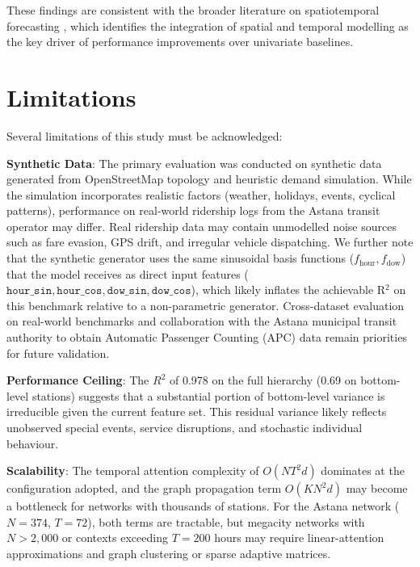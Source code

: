 These findings are consistent with the broader literature on spatiotemporal forecasting \cite{zhang2021deep,fan2020urban}, which identifies the integration of spatial and temporal modelling as the key driver of performance improvements over univariate baselines.

\section{Limitations}
\label{sec:discussion_limitations}

Several limitations of this study must be acknowledged:

\textbf{Synthetic Data}: The primary evaluation was conducted on synthetic data generated from OpenStreetMap topology and heuristic demand simulation. While the simulation incorporates realistic factors (weather, holidays, events, cyclical patterns), performance on real-world ridership logs from the Astana transit operator may differ. Real ridership data may contain unmodelled noise sources such as fare evasion, GPS drift, and irregular vehicle dispatching. We further note that the synthetic generator uses the same sinusoidal basis functions ($f_{\text{hour}}, f_{\text{dow}}$) that the model receives as direct input features ($\texttt{hour\_sin}, \texttt{hour\_cos}, \texttt{dow\_sin}, \texttt{dow\_cos}$), which likely inflates the achievable R$^2$ on this benchmark relative to a non-parametric generator. Cross-dataset evaluation on real-world benchmarks and collaboration with the Astana municipal transit authority to obtain Automatic Passenger Counting (APC) data remain priorities for future validation.

\textbf{Performance Ceiling}: The $R^2$ of 0.978 on the full hierarchy (0.69 on bottom-level stations) suggests that a substantial portion of bottom-level variance is irreducible given the current feature set. This residual variance likely reflects unobserved special events, service disruptions, and stochastic individual behaviour.

\textbf{Scalability}: The temporal attention complexity of $O(N T^2 d)$ dominates at the configuration adopted, and the graph propagation term $O(K N^2 d)$ may become a bottleneck for networks with thousands of stations. For the Astana network ($N = 374$, $T = 72$), both terms are tractable, but megacity networks with $N > 2{,}000$ or contexts exceeding $T = 200$ hours may require linear-attention approximations and graph clustering or sparse adaptive matrices.

